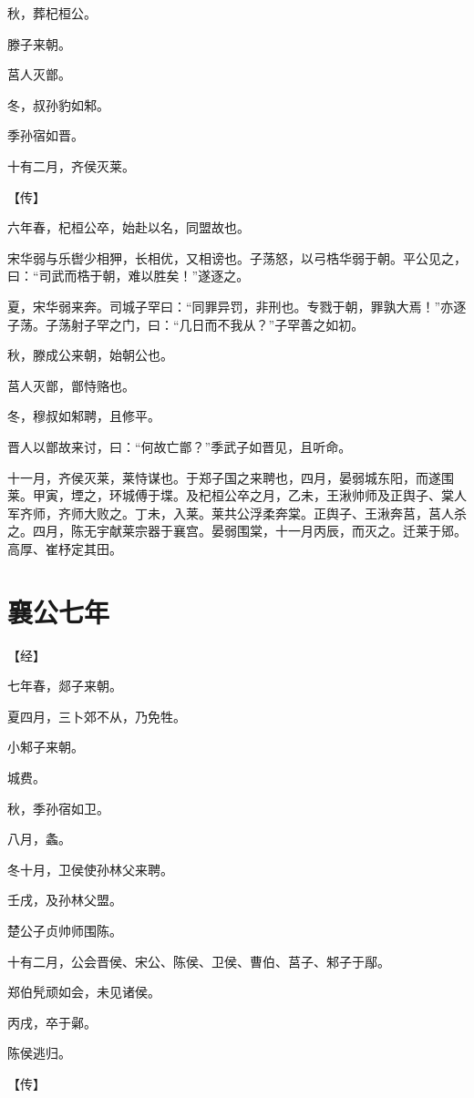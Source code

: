 \documentclass[a4paper,12pt,UTF8,twoside]{ctexbook}
\begin{document}
秋，葬杞桓公。

滕子来朝。

莒人灭鄫。

冬，叔孙豹如邾。

季孙宿如晋。

十有二月，齐侯灭莱。

【传】

六年春，杞桓公卒，始赴以名，同盟故也。

宋华弱与乐辔少相狎，长相优，又相谤也。子荡怒，以弓梏华弱于朝。平公见之，曰：“司武而梏于朝，难以胜矣！”遂逐之。

夏，宋华弱来奔。司城子罕曰：“同罪异罚，非刑也。专戮于朝，罪孰大焉！”亦逐子荡。子荡射子罕之门，曰：“几日而不我从？”子罕善之如初。

秋，滕成公来朝，始朝公也。

莒人灭鄫，鄫恃赂也。

冬，穆叔如邾聘，且修平。

晋人以鄫故来讨，曰：“何故亡鄫？”季武子如晋见，且听命。

十一月，齐侯灭莱，莱恃谋也。于郑子国之来聘也，四月，晏弱城东阳，而遂围莱。甲寅，堙之，环城傅于堞。及杞桓公卒之月，乙未，王湫帅师及正舆子、棠人军齐师，齐师大败之。丁未，入莱。莱共公浮柔奔棠。正舆子、王湫奔莒，莒人杀之。四月，陈无宇献莱宗器于襄宫。晏弱围棠，十一月丙辰，而灭之。迁莱于郳。高厚、崔杼定其田。



\section{襄公七年}



【经】

七年春，郯子来朝。

夏四月，三卜郊不从，乃免牲。

小邾子来朝。

城费。

秋，季孙宿如卫。

八月，螽。

冬十月，卫侯使孙林父来聘。

壬戌，及孙林父盟。

楚公子贞帅师围陈。

十有二月，公会晋侯、宋公、陈侯、卫侯、曹伯、莒子、邾子于鄬。

郑伯髠顽如会，未见诸侯。

丙戌，卒于鄵。

陈侯逃归。

【传】
\end{document}
